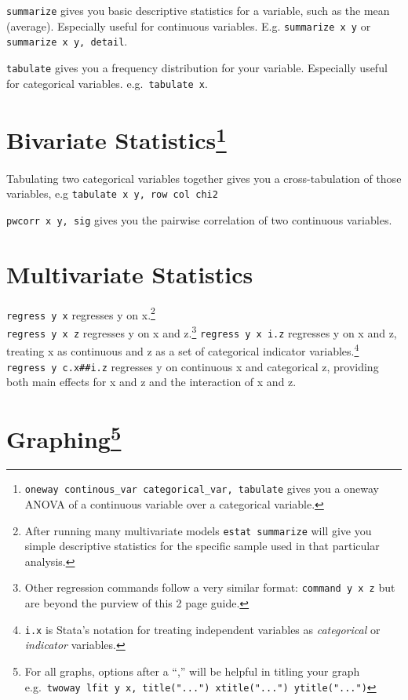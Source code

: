 \documentclass[11pt,nofonts,]{tufte-handout}
\begin{document}
\texttt{summarize} gives you basic descriptive statistics for a
variable, such as the mean (average). Especially useful for continuous
variables. E.g. \texttt{summarize\ x\ y} or
\texttt{summarize\ x\ y,\ detail}.

\texttt{tabulate} gives you a frequency distribution for your variable.
Especially useful for categorical variables. e.g.~\texttt{tabulate\ x}.

\hypertarget{bivariate-statisticsanova}{%
\section[Bivariate Statistics]{\texorpdfstring{Bivariate
Statistics\footnote{\texttt{oneway\ continous\_var\ categorical\_var,\ tabulate}
  gives you a oneway ANOVA of a continuous variable over a categorical
  variable.}}{Bivariate Statistics}}\label{bivariate-statisticsanova}}

Tabulating two categorical variables together gives you a
cross-tabulation of those variables, e.g
\texttt{tabulate\ x\ y,\ row\ col\ chi2}

\texttt{pwcorr\ x\ y,\ sig} gives you the pairwise correlation of two
continuous variables.

\hypertarget{multivariate-statistics}{%
\section{Multivariate Statistics}\label{multivariate-statistics}}

\texttt{regress\ y\ x} regresses y on x.\footnote{After running many
  multivariate models \texttt{estat\ summarize} will give you simple
  descriptive statistics for the specific sample used in that particular
  analysis.}\\
\texttt{regress\ y\ x\ z} regresses y on x and z.\footnote{Other
  regression commands follow a very similar format:
  \texttt{command\ y\ x\ z} but are beyond the purview of this 2 page
  guide.} \texttt{regress\ y\ x\ i.z} regresses y on x and z, treating x
as continuous and z as a set of categorical indicator
variables.\footnote{\texttt{i.x} is Stata's notation for treating
  independent variables as \emph{categorical} or \emph{indicator}
  variables.} \texttt{regress\ y\ c.x\#\#i.z} regresses y on continuous
x and categorical z, providing both main effects for x and z and the
interaction of x and z.

\hypertarget{graphinggraph-options}{%
\section[Graphing]{\texorpdfstring{Graphing\footnote{For all graphs,
  options after a ``,'' will be helpful in titling your graph
  e.g.~\texttt{twoway\ lfit\ y\ x,\ title("...")\ xtitle("...")\ ytitle("...")}}}{Graphing}}\label{graphinggraph-options}}
\end{document}
